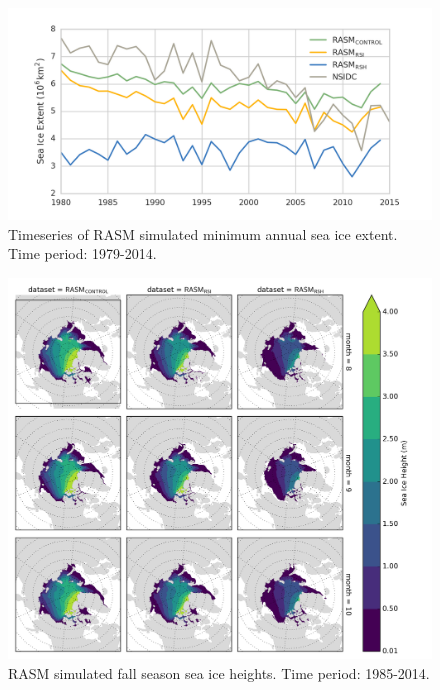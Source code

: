 \documentclass[draft]{agujournal}
\begin{document}
\clearpage
\begin{figure}
    \centering
    \includegraphics[width=16cm,keepaspectratio]{sea_ice_min_timeseries}
    \caption{Timeseries of RASM simulated minimum annual sea ice extent. Time period: 1979-2014.}
    \label{fig:sea_ice_min_ts_sup}
\end{figure}

\clearpage
\begin{figure}
    \centering
    \includegraphics[width=16cm,keepaspectratio]{seaice_height}
    \caption{RASM simulated fall season sea ice heights. Time period: 1985-2014.}
    \label{fig:sea_ice_height_sup}
\end{figure}
\end{document}
